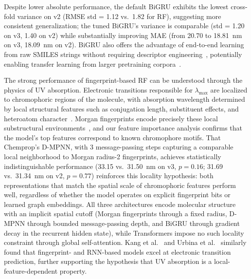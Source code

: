 \documentclass[journal=jcisd8,manuscript=article]{achemso}
\begin{document}
Despite lower absolute performance, the default BiGRU exhibits the lowest cross-fold variance on v2 (RMSE std = 1.12 vs.\ 1.82 for RF), suggesting more consistent generalization; the tuned BiGRU's variance is comparable (std = 1.20 on v3, 1.40 on v2) while substantially improving MAE (from 20.70 to 18.81~nm on v3, 18.09~nm on v2).
BiGRU also offers the advantage of end-to-end learning from raw SMILES strings without requiring descriptor engineering~\cite{chenMolecularLanguage2023}, potentially enabling transfer learning from larger pretraining corpora~\cite{vermeire2021transfer}.

The strong performance of fingerprint-based RF can be understood through the physics of UV absorption.
Electronic transitions responsible for $\lambda_{\max}$ are localized to chromophoric regions of the molecule, with absorption wavelength determined by local structural features such as conjugation length, substituent effects, and heteroatom character~\cite{flemingMolecular2010, reichardt2011solvents}.
Morgan fingerprints encode precisely these local substructural environments~\cite{rogers2010extended}, and our feature importance analysis confirms that the model's top features correspond to known chromophore motifs.
That Chemprop's D-MPNN, with 3 message-passing steps capturing a comparable local neighborhood to Morgan radius-2 fingerprints, achieves statistically indistinguishable performance (33.15 vs.\ 31.50~nm on v3, $p = 0.16$; 31.69 vs.\ 31.34~nm on v2, $p = 0.77$) reinforces this locality hypothesis: both representations that match the spatial scale of chromophoric features perform well, regardless of whether the model operates on explicit fingerprint bits or learned graph embeddings.
All three architectures encode molecular structure with an implicit spatial cutoff (Morgan fingerprints through a fixed radius, D-MPNN through bounded message-passing depth, and BiGRU through gradient decay in the recurrent hidden state), while Transformers impose no such locality constraint through global self-attention.
Kang et al.~\cite{kang2020prediction} and Urbina et al.~\cite{beard2022uvadvisor} similarly found that fingerprint- and RNN-based models excel at electronic transition prediction, further supporting the hypothesis that UV absorption is a local-feature-dependent property.
\end{document}
